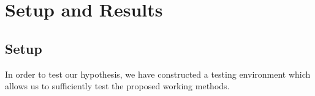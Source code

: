 \chapter{Setup and Results}

\section{Setup}

In order to test our hypothesis, we have constructed a testing environment which allows us to sufficiently test the proposed working methods.